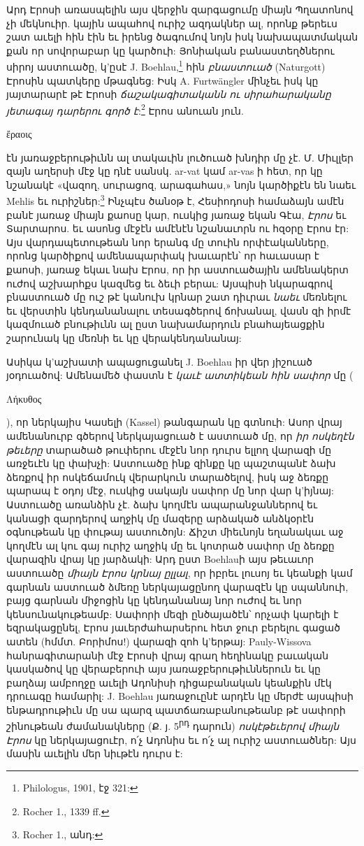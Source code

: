 \documentclass{article}
\begin{document}
{Արդ Էրոսի առասպելին այս վերջին զարգացումը միայն Պղատոնով չի մեկնուիր. կային ապահով ուրիշ ազդակներ ալ, որոնք թերեւս շատ աւելի հին էին եւ իրենց ծագումով նոյն իսկ նախապատմական քան որ սովորաբար կը կարծուի: Յոնիական բանաստեղծներու սիրոյ աստուածը, կ'ըսէ J. Boehlau,\footnote{Philologus, 1901, էջ 321:} հին \emph{բնաստուած} (Naturgott) Էրոսին պատկերը մթագնեց: Իսկ A. Furtwängler մինչեւ իսկ կը յայտարարէ թէ Էրոսի \emph{ճաշակագիտականն ու սիրահարականը յետագայ դարերու գործ է}:\footnote{Rocher 1., 1339 ff.} Էրոս անուան յուն. \begin{greek}ἔραοις\end{greek} էն յառաջբերութիւնն ալ տակաւին լուծուած խնդիր մը չէ. Մ. Միւլլեր զայն աղերսի մէջ կը դնէ սանսկ. ar-vat կամ ar-vas ի հետ, որ կը նշանակէ «վազող, սուրացոզ, արագահաս,» նոյն կարծիքէն են նաեւ Mehlis եւ ուրիշներ:\footnote{Rocher 1., անդ:} Ինչպէս ծանօթ է, Հեսիոդոսի համաձայն ամէն բանէ յառաջ միայն քաոսը կար, ուսկից յառաջ եկան Գէա, \emph{Էրոս} եւ Տարտարոս. եւ ասոնց մէջէն ամէնէն նշանաւորն ու հզօրը Էրոս էր: Այս վարդապետութեան նոր երանգ մը տուին որփէականները, որոնց կարծիքով ամենապարփակ խաւարէն՝ որ հաւասար է քաոսի, յառաջ եկաւ նախ Էրոս, որ իր աստուածային ամենակերտ ուժով աշխարհքս կազմեց եւ ձեւի բերաւ: Այսպիսի նկարագրով բնաստուած մը ուշ թէ կանուխ կրնար շատ դիւրաւ \emph{նաեւ} մեռնելու եւ վերստին կենդանանալու տեսագծերով ճոխանալ, վասն զի իրմէ կազմուած բնութիւնն ալ ըստ նախամարդուն բնահայեացքին շարունակ կը մեռնի եւ կը վերակենդանանայ:

Ասիկա կ'աշխատի ապացուցանել J. Boehlau իր վեր յիշուած յօդուածով: Ամենամեծ փաստն է \emph{կաւէ ատտիկեան հին սափոր} մը (\begin{greek}Λήκυθος\end{greek}), որ ներկայիս Կասելի (Kassel) թանգարան կը գտնուի: Ասոր վրայ ամենանուրբ գծերով ներկայացուած է աստուած մը, որ \emph{իր ոսկեղէն թեւերը} տարածած թուփերու մէջէն նոր դուրս ելլող վարազի մը առջեւէն կը փախչի: Աստուածը ինք զինքը կը պաշտպանէ ձախ ձեռքով իր ոսկեճամուկ վերարկուն տարածելով, իսկ աջ ձեռքը պարապ է օդոյ մէջ, ուսկից սակայն սափոր մը նոր վար կ'իյնայ: Աստուածը առանձին չէ. ձախ կողմէն ապարանջաններով եւ կանացի զարդերով աղջիկ մը մազերը արձակած անձկօրէն օգնութեան կը փութայ աստուծոյն: Ճիշտ միեւնոյն եղանակաւ աջ կողմէն ալ կու գայ ուրիշ աղջիկ մը եւ կոտրած սափոր մը ձեռքը վարազին վրայ կը յարձակի: Արդ ըստ Boehlauի այս թեւաւոր աստուածը \emph{միայն Էրոս կրնայ ըլլալ}, որ իբրեւ լուսոյ եւ կեանքի կամ գարնան աստուած ձմեռը ներկայացընող վարազէն կը սպաննուի, բայց գարնան միջոցին կը կենդանանայ նոր ուժով եւ նոր կենսունակութեամբ: Սափորի մեզի ընծայածէն՝ որչափ կարելի է եզրակացընել, Էրոս յաւերժահարսերու հետ ջուր բերելու գացած ատեն (հմմտ. Բորիմոս!) վարազի զոհ կ'երթայ: Pauly-Wissova հանրագիտարանի մէջ Էրոսի վրայ գրաղ հեղինակը բաւական կասկածով կը վերաբերուի այս յառաջբերութիւններուն եւ կը բաղձայ ամբողջը աւելի Ադոնիսի դիցաբանական կեանքին մէկ դրուագը համարիլ: J. Boehlau յառաջուընէ արդէն կը մերժէ այսպիսի ենթադրութիւն մը սա պարզ պատճառաբանութեանբ թէ սափորի շինութեան ժամանակները (Ք. յ. 5\textsuperscript{րդ} դարուն) \emph{ոսկէթեւերով միայն Էրոս} կը ներկայացուէր, ո՛չ Ադոնիս եւ ո՛չ ալ ուրիշ աստուածներ: Այս մասին աւելին մեր նիւթէն դուրս է:

}
\end{document}
